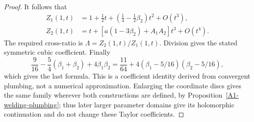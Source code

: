 \begin{proof}
It follows that
\begin{align*}
 Z_1(1,t)&=1+\tfrac12t+(\tfrac14-\tfrac12\beta_2)t^2+O(t^3),\\
 Z_2(1,t)&=t+\left[a(1-3\beta_2)+A_1A_2\right]t^3+O(t^4).
\end{align*}
The required cross-ratio is $\Lambda=Z_2(1,t)/Z_1(1,t)$.
Division gives the stated symmetric cubic coefficient. Finally
\[
 \frac9{16}-\frac54(\beta_1+\beta_2)+4\beta_1\beta_2
 =\frac{11}{64}
      +4(\beta_1-5/16)(\beta_2-5/16),
\]
which gives the last formula. This is a coefficient identity
derived from convergent plumbing, not a numerical approximation.
Enlarging the coordinate discs gives the same family wherever
both constructions are defined, by
Proposition~\ref{A1-welding-plumbing}; thus later larger parameter
domains give its holomorphic continuation and do not change
these Taylor coefficients.
\end{proof}

